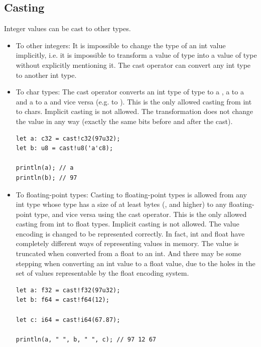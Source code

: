 \subsection{Casting}

Integer values can be cast to other types.

\begin{itemize}
  \setlength\itemsep{-4pt}
\item To other integers: It is impossible to change the type of an int value
implicitly, i.e. it is impossible to transform a value of type  into
a value of type  without explicitly mentioning it. The cast operator
 can convert any int type to another int type.


\item To char types: The cast operator converts an int type of
  type  to a , a  to a  and a
   to a  and vice versa (e.g.  to
  ). This is the only allowed casting from int to chars. Implicit
  casting is not allowed. The transformation does not change the value in any
  way (exactly the same bits before and after the cast).

  \begin{lstlisting}[style=coloredverbatim]
let a: c32 = cast!c32(97u32);
let b: u8 = cast!u8('a'c8);

println(a); // a
println(b); // 97
  \end{lstlisting}

\item To floating-point types: Casting to floating-point types is allowed from
  any int type whose type has a size of at least  bytes (,
   and higher) to any floating-point type, and vice versa using the
  cast operator. This is the only allowed casting from int to float types.
  Implicit casting is not allowed. The value encoding is changed to be
  represented correctly. In fact, int and float have completely different ways
  of representing values in memory. The value is truncated when converted from a
  float to an int. And there may be some stepping when converting an int value
  to a float value, due to the holes in the set of values representable by the
  float encoding system.

  \begin{lstlisting}[style=coloredverbatim]
let a: f32 = cast!f32(97u32);
let b: f64 = cast!f64(12);

let c: i64 = cast!i64(67.87);

println(a, " ", b, " ", c); // 97 12 67
  \end{lstlisting}

\end{itemize}

